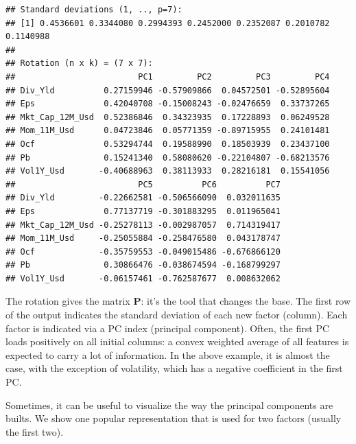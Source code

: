 \documentclass[]{krantz}
\makeatletter
\newenvironment{Shaded}{\begin{snugshade}}{\end{snugshade}}
\newcommand{\CommentTok}[1]{\textcolor[rgb]{0.37,0.37,0.37}{\textit{#1}}}
\newcommand{\DataTypeTok}[1]{\textcolor[rgb]{0.27,0.27,0.27}{#1}}
\newcommand{\KeywordTok}[1]{\textcolor[rgb]{0.27,0.27,0.27}{\textbf{#1}}}
\newcommand{\NormalTok}[1]{#1}
\newcommand{\OtherTok}[1]{\textcolor[rgb]{0.37,0.37,0.37}{#1}}
\newcommand{\StringTok}[1]{\textcolor[rgb]{0.5,0.5,0.5}{#1}}
\newenvironment{kframe}{%
\medskip{}
\setlength{\fboxsep}{.8em}
 \def\at@end@of@kframe{}%
 \ifinner\ifhmode%
  \def\at@end@of@kframe{\end{minipage}}%
  \begin{minipage}{\columnwidth}%
 \fi\fi%
 \def\FrameCommand##1{\hskip\@totalleftmargin \hskip-\fboxsep
 \colorbox{shadecolor}{##1}\hskip-\fboxsep
     \hskip-\linewidth \hskip-\@totalleftmargin \hskip\columnwidth}%
 \MakeFramed {\advance\hsize-\width
   \@totalleftmargin\z@ \linewidth\hsize
   \@setminipage}}%
 {\par\unskip\endMakeFramed%
 \at@end@of@kframe}
\renewenvironment{Shaded}{\begin{kframe}}{\end{kframe}}
\theoremstyle{definition}
\theoremstyle{definition}
\theoremstyle{definition}
\theoremstyle{remark}
\makeatother
\begin{document}
\begin{verbatim}
## Standard deviations (1, .., p=7):
## [1] 0.4536601 0.3344080 0.2994393 0.2452000 0.2352087 0.2010782 0.1140988
## 
## Rotation (n x k) = (7 x 7):
##                         PC1         PC2         PC3         PC4
## Div_Yld          0.27159946 -0.57909866  0.04572501 -0.52895604
## Eps              0.42040708 -0.15008243 -0.02476659  0.33737265
## Mkt_Cap_12M_Usd  0.52386846  0.34323935  0.17228893  0.06249528
## Mom_11M_Usd      0.04723846  0.05771359 -0.89715955  0.24101481
## Ocf              0.53294744  0.19588990  0.18503939  0.23437100
## Pb               0.15241340  0.58080620 -0.22104807 -0.68213576
## Vol1Y_Usd       -0.40688963  0.38113933  0.28216181  0.15541056
##                         PC5          PC6          PC7
## Div_Yld         -0.22662581 -0.506566090  0.032011635
## Eps              0.77137719 -0.301883295  0.011965041
## Mkt_Cap_12M_Usd -0.25278113 -0.002987057  0.714319417
## Mom_11M_Usd     -0.25055884 -0.258476580  0.043178747
## Ocf             -0.35759553 -0.049015486 -0.676866120
## Pb               0.30866476 -0.038674594 -0.168799297
## Vol1Y_Usd       -0.06157461 -0.762587677  0.008632062
\end{verbatim}

\normalsize

The rotation gives the matrix \(\textbf{P}\): it's the tool that changes
the base. The first row of the output indicates the standard deviation
of each new factor (column). Each factor is indicated via a PC index
(principal component). Often, the first PC loads positively on all
initial columns: a convex weighted average of all features is expected
to carry a lot of information. In the above example, it is almost the
case, with the exception of volatility, which has a negative coefficient
in the first PC.

Sometimes, it can be useful to visualize the way the principal
components are builts. We show one popular representation that is used
for two factors (usually the first two).

\footnotesize

\begin{Shaded}
\end{Shaded}
\end{document}
